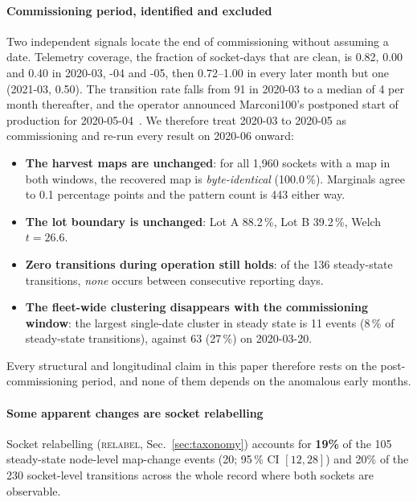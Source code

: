 \documentclass[10pt,conference]{IEEEtran}
\begin{document}
\paragraph*{Commissioning period, identified and excluded}
\label{par:commissioning}
Two independent signals locate the end of commissioning without assuming a date. Telemetry
coverage, the fraction of socket-days that are clean, is 0.82, 0.00 and 0.40 in 2020-03, -04 and
-05, then 0.72--1.00 in every later month but one (2021-03, 0.50). The transition rate falls from
91 in 2020-03 to a median of 4 per month thereafter, and the operator announced Marconi100's
postponed start of production for 2020-05-04~\cite{cineca_m100_status}. We therefore treat
2020-03 to 2020-05 as commissioning and re-run every result on 2020-06 onward:

\begin{itemize}\itemsep1pt
\item \textbf{The harvest maps are unchanged}: for all 1{,}960 sockets with a map in both windows,
      the recovered map is \emph{byte-identical} (100.0\,\%). Marginals agree to 0.1 percentage
      points and the pattern count is 443 either way.
\item \textbf{The lot boundary is unchanged}: Lot A 88.2\,\%, Lot B 39.2\,\%, Welch $t=26.6$.
\item \textbf{Zero transitions during operation still holds}: of the 136 steady-state transitions,
      \emph{none} occurs between consecutive reporting days.
\item \textbf{The fleet-wide clustering disappears with the commissioning window}: the largest
      single-date cluster in steady state is 11 events (8\,\% of steady-state transitions), against
      63 (27\,\%) on 2020-03-20.
\end{itemize}

Every structural and longitudinal claim in this paper therefore rests on the post-commissioning
period, and none of them depends on the anomalous early months.

\paragraph*{Some apparent changes are socket relabelling} Socket relabelling
(\textsc{relabel}, Sec.~\ref{sec:taxonomy}) accounts for \textbf{19\%} of the 105 steady-state node-level map-change events (20; 95\,\%
CI $[12,28]$) and 20\% of the 230 socket-level transitions across the whole record where both
sockets are observable.
\end{document}
